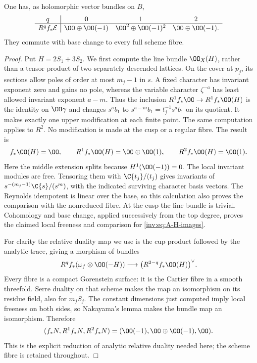 \begin{proposition}\label{inv:A1.2}\label{wb:prop:log-relative-direct-images}
One has, as holomorphic vector bundles on $B$,
\[
\begin{array}{c|ccc}
q&0&1&2\\\hline
R^qf_*\mathcal E&\OO\oplus\OO(-1)&
 \OO^2\oplus\OO(-1)^2&\OO\oplus\OO(-1).
\end{array}
\]
They commute with base change to every full scheme fibre.
\end{proposition}

\begin{proof}
Put $H=2S_1+3S_2$.  We first compute the line bundle $\OO_X(H)$,
rather than a tensor product of two separately descended lattices.
On the cover at $p_j$, its sections allow poles of order at most $m_j-1$
in $s$.  A fixed character has invariant exponent zero and gains no
pole, whereas the variable character $\zeta^{-a}$ has least allowed
invariant exponent $a-m$.  Thus the inclusion
$R^1f_*\OO\to R^1f_*\OO(H)$ is the identity on $\OO\gamma$ and
changes $s^ab_1$ to $s^{a-m}b_1=t_j^{-1}s^ab_1$ on its quotient.
It makes exactly one upper modification at each finite point.
The same computation applies to $R^2$.  No modification is made at
the cusp or a regular fibre.  The result is
\begin{equation}\label{inv:eq:A-H-images}
f_*\OO(H)=\OO,\qquad
R^1f_*\OO(H)=\OO\oplus\OO(1),\qquad
R^2f_*\OO(H)=\OO(1).
\end{equation}
Here the middle extension splits because $H^1(\OO(-1))=0$.
The local invariant modules are free.  Tensoring them with
$\C\{t_j\}/(t_j)$ gives invariants of
$s^{-(m_j-1)}\C\{s\}/(s^m)$, with the indicated surviving character
basis vectors.  The Reynolds idempotent is linear over the base,
so this calculation also proves the comparison with the nonreduced
fibre.  At the cusp the line bundle is trivial.  Cohomology and base
change, applied successively from the top degree, proves the claimed
local freeness and comparison for \eqref{inv:eq:A-H-images}.

For clarity the relative duality map we use is the cup product followed
by the analytic trace, giving a morphism of bundles
\[
R^qf_*(\omega_f\otimes\OO(-H))\longrightarrow
\bigl(R^{2-q}f_*\OO(H)\bigr)^\vee.
\]
Every fibre is a compact Gorenstein surface: it is the Cartier fibre
in a smooth threefold.  Serre duality on that scheme makes the map
an isomorphism on its residue field, also for $m_jS_j$.  The constant
dimensions just computed imply local freeness on both sides, so
Nakayama's lemma makes the bundle map an isomorphism.  Therefore
\begin{equation}\label{inv:eq:A-N-images}
(f_*N,R^1f_*N,R^2f_*N)
=(\OO(-1),\OO\oplus\OO(-1),\OO).
\end{equation}
This is the explicit reduction of analytic relative duality needed
here; the scheme fibre is retained throughout.


\end{proof}

